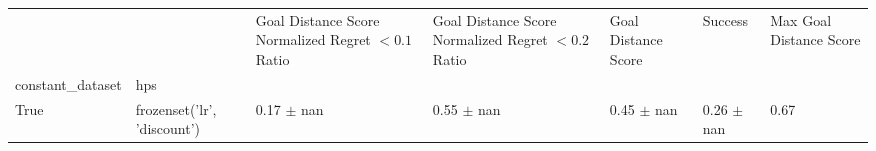 \begin{tabular}{lllllll}
\toprule
 &  & Goal Distance Score Normalized Regret $< 0.1$ Ratio & Goal Distance Score Normalized Regret $< 0.2$ Ratio & Goal Distance Score & Success & Max Goal Distance Score \\
constant_dataset & hps &  &  &  &  &  \\
\midrule
True & frozenset({'lr', 'discount'}) & 0.17 $\pm$ nan & 0.55 $\pm$ nan & 0.45 $\pm$ nan & 0.26 $\pm$ nan & 0.67 \\
\cline{1-7}
\bottomrule
\end{tabular}
